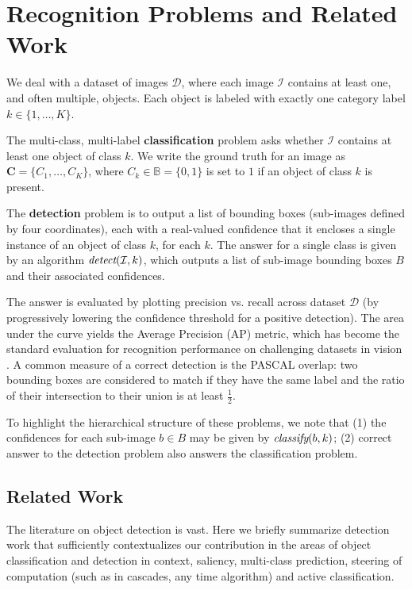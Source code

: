 \section{Recognition Problems and Related Work}

We deal with a dataset of images $\mathcal{D}$, where each image $\mathcal{I}$ contains at least one, and often multiple, objects.
Each object is labeled with exactly one category label $k \in \{1, \dots, K\}$.

The multi-class, multi-label \textbf{classification} problem asks whether $\mathcal{I}$ contains at least one object of class $k$.
We write the ground truth for an image as $\mathbf{C}=\{C_1,\dots,C_K\}$, where $C_k \in \mathbb{B} = \{0,1\}$ is set to $1$ if an object of class $k$ is present.

The \textbf{detection} problem is to output a list of bounding boxes (sub-images defined by four coordinates), each with a real-valued confidence that it encloses a single instance of an object of class $k$, for each $k$.
The answer for a single class is given by an algorithm $\emph{detect}(\mathcal{I},k)$, which outputs a list of sub-image bounding boxes $B$ and their associated confidences.

The answer is evaluated by plotting precision vs. recall across dataset $\mathcal{D}$ (by progressively lowering the confidence threshold for a positive detection).
The area under the curve yields the Average Precision (AP) metric, which has become the standard evaluation for recognition performance on challenging datasets in vision \cite{pascal-voc-2010}.
A common measure of a correct detection is the PASCAL overlap: two bounding boxes are considered to match if they have the same label and the ratio of their intersection to their union is at least $\frac{1}{2}$.

To highlight the hierarchical structure of these problems, we note that (1) the confidences for each sub-image $b \in B$ may be given by $\emph{classify}(b,k)$; (2) correct answer to the detection problem also answers the classification problem.

\subsection{Related Work}
The literature on object detection is vast.
Here we briefly summarize detection work that sufficiently contextualizes our contribution in the areas of object classification and detection in context, saliency, multi-class prediction, steering of computation (such as in cascades, any time algorithm) and active classification.

